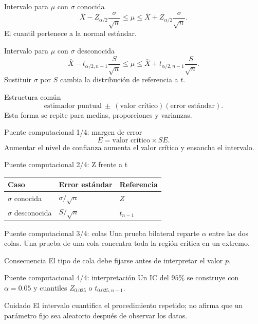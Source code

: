 \documentclass[10pt,aspectratio=169]{beamer}
\begin{document}
\begin{frame}{Intervalo para $\mu$ con $\sigma$ conocida}
  \footnotesize
  \[
    \bar X-Z_{\alpha/2}\frac{\sigma}{\sqrt n}
    \le\mu\le
    \bar X+Z_{\alpha/2}\frac{\sigma}{\sqrt n}.
  \]
  El cuantil pertenece a la normal estándar.
\end{frame}

\begin{frame}{Intervalo para $\mu$ con $\sigma$ desconocida}
  \footnotesize
  \[
    \bar X-t_{\alpha/2,n-1}\frac{S}{\sqrt n}
    \le\mu\le
    \bar X+t_{\alpha/2,n-1}\frac{S}{\sqrt n}.
  \]
  Sustituir $\sigma$ por $S$ cambia la distribución de referencia a $t$.
\end{frame}

\begin{frame}{Estructura común}
  \footnotesize
  \[
    \text{estimador puntual}\ \pm\ (\text{valor crítico})
    (\text{error estándar}).
  \]
  Esta forma se repite para medias, proporciones y varianzas.
\end{frame}

\begin{frame}{Puente computacional 1/4: margen de error}
  \footnotesize
  \[
    E=\text{valor crítico}\times SE.
  \]
  Aumentar el nivel de confianza aumenta el valor crítico y ensancha el
  intervalo.
\end{frame}

\begin{frame}{Puente computacional 2/4: Z frente a t}
  \footnotesize
  \begin{tabular}{lll}
    \hline
    Caso & Error estándar & Referencia \\
    \hline
    $\sigma$ conocida & $\sigma/\sqrt n$ & $Z$ \\
    $\sigma$ desconocida & $S/\sqrt n$ & $t_{n-1}$ \\
    \hline
  \end{tabular}
\end{frame}

\begin{frame}{Puente computacional 3/4: colas}
  \footnotesize
  Una prueba bilateral reparte $\alpha$ entre las dos colas. Una prueba de una
  cola concentra toda la región crítica en un extremo.
  \begin{block}{Consecuencia}
    El tipo de cola debe fijarse antes de interpretar el valor $p$.
  \end{block}
\end{frame}

\begin{frame}{Puente computacional 4/4: interpretación}
  \footnotesize
  Un IC del $95\%$ se construye con $\alpha=0.05$ y cuantiles
  $Z_{0.025}$ o $t_{0.025,n-1}$.
  \begin{alertblock}{Cuidado}
    El intervalo cuantifica el procedimiento repetido; no afirma que un
    parámetro fijo sea aleatorio después de observar los datos.
  \end{alertblock}
\end{frame}
\end{document}
